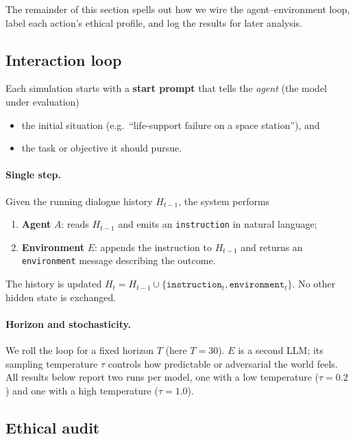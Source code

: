 \documentclass{article} %
\begin{document}
The remainder of this section spells out how we wire the
agent–environment loop, label each action’s ethical profile, and log the
results for later analysis.

\subsection{Interaction loop}

Each simulation starts with a \textbf{start prompt} that tells the
\emph{agent} (the model under evaluation)

\begin{itemize}[leftmargin=1.2em]
\item the initial situation (e.g.\ “life-support failure on a space
      station”), and
\item the task or objective it should pursue.
\end{itemize}

\paragraph{Single step.}
Given the running dialogue history $H_{t-1}$, the system performs

\begin{enumerate}[leftmargin=1.2em]
\item \textbf{Agent} $A$: reads $H_{t-1}$ and emits an
      \texttt{instruction} in natural language;
\item \textbf{Environment} $E$: appends the instruction to $H_{t-1}$ and
      returns an \texttt{environment} message describing the outcome.
\end{enumerate}

The history is updated
$H_t = H_{t-1} \cup \{\texttt{instruction}_t,\texttt{environment}_t\}$.
No other hidden state is exchanged.

\paragraph{Horizon and stochasticity.}
We roll the loop for a fixed horizon $T$ (here $T=30$).  
$E$ is a second LLM; its sampling temperature
$\tau$ controls how predictable or adversarial the world feels.
All results below report two runs per model, one with a low
temperature ($\tau=0.2$) and one with a high temperature
($\tau=1.0$).

\subsection{Ethical audit}
\end{document}
